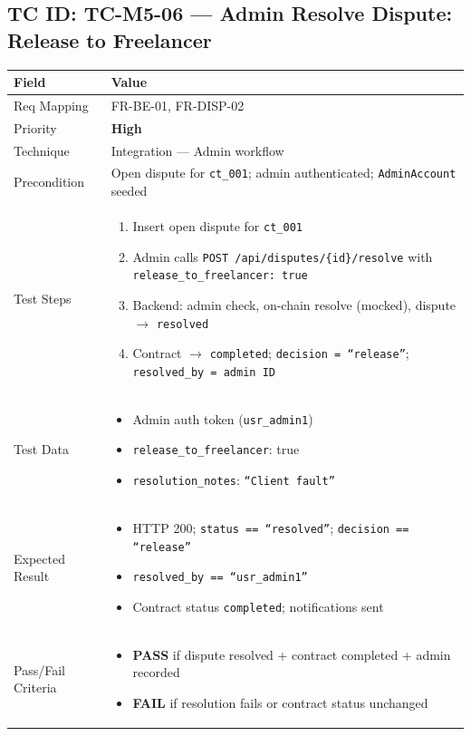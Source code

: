 \documentclass[12pt,a4paper]{article}
\newcommand{\sevhigh}{\textcolor{severityhigh}{\textbf{High}}}
\newcommand{\passresult}{\textcolor{passgreen}{\textbf{PASS}}}
\newcommand{\failresult}{\textcolor{failred}{\textbf{FAIL}}}
\begin{document}
\vspace{0.8cm}

\subsection{TC ID: TC-M5-06 --- Admin Resolve Dispute: Release to Freelancer}

\begin{tabular}{|p{}|p{}|}
\hline
\rowcolor{lightblue} \textbf{Field} & \textbf{Value} \\
\hline
Req Mapping & FR-BE-01, FR-DISP-02 \\
\hline
Priority & \sevhigh \\
\hline
Technique & Integration --- Admin workflow \\
\hline
Precondition & Open dispute for \texttt{ct\_001}; admin authenticated; \texttt{AdminAccount} seeded \\
\hline
Test Steps &
\begin{enumerate}[nosep, leftmargin=*]
  \item Insert open dispute for \texttt{ct\_001}
  \item Admin calls \texttt{POST /api/disputes/\{id\}/resolve} with \texttt{release\_to\_freelancer: true}
  \item Backend: admin check, on-chain resolve (mocked), dispute $\rightarrow$ \texttt{resolved}
  \item Contract $\rightarrow$ \texttt{completed}; \texttt{decision = ``release''}; \texttt{resolved\_by = admin ID}
\end{enumerate} \\
\hline
Test Data &
\begin{itemize}[nosep, leftmargin=*]
  \item Admin auth token (\texttt{usr\_admin1})
  \item \texttt{release\_to\_freelancer}: true
  \item \texttt{resolution\_notes}: \texttt{``Client fault''}
\end{itemize} \\
\hline
Expected Result &
\begin{itemize}[nosep, leftmargin=*]
  \item HTTP 200; \texttt{status == ``resolved''}; \texttt{decision == ``release''}
  \item \texttt{resolved\_by == ``usr\_admin1''}
  \item Contract status \texttt{completed}; notifications sent
\end{itemize} \\
\hline
Pass/Fail Criteria &
\begin{itemize}[nosep, leftmargin=*]
  \item \passresult{} if dispute resolved + contract completed + admin recorded
  \item \failresult{} if resolution fails or contract status unchanged
\end{itemize} \\
\hline
\end{tabular}
\end{document}
